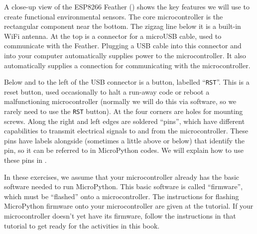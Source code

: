 A close-up view of the ESP8266 Feather () shows the key features we will use to create functional environmental sensors.
The core microcontroller is the rectangular component near the bottom.
The zigzag line below it is a built-in WiFi antenna.
At the top is a connector for a microUSB cable, used to communicate with the Feather.
Plugging a USB cable into this connector and into your computer automatically supplies power to the microcontroller.
It also automatically supplies a connection for communicating with the microcontroller.%

Below and to the left of the USB connector is a button, labelled ``\texttt{RST}''.
This is a reset button, used occasionally to halt a run-away code or reboot a malfunctioning microcontroller (normally we will do this via software, so we rarely need to use the \texttt{RST} button).
At the four corners are holes for mounting screws.
Along the right and left edges are soldered ``pins'', %
which have different capabilities to transmit electrical signals to and from the microcontroller.
These pins have labels alongside (sometimes a little above or below) that identify the pin, so it can be referred to in MicroPython codes.
We will explain how to use these pins in .

\begin{kaobox}[frametitle=A flash of insight]
	In these exercises, we assume that your microcontroller already has the basic software needed to run MicroPython. This basic software is called ``firmware'', which must be ``flashed'' onto a microcontroller. The instructions for flashing MicroPython firmware onto your microcontroller are given at the  tutorial. If your microcontroller doesn't yet have its firmware, follow the instructions in that tutorial to get ready for the activities in this book.
\end{kaobox}



